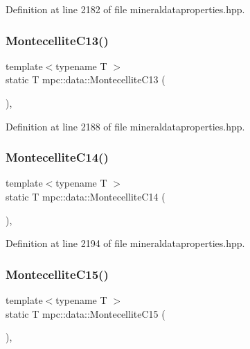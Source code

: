 Definition at line 2182 of file mineraldataproperties.\+hpp.

\mbox{\label{namespacempc_1_1data_a9c1bb28186799335099a03bfcefd5e34}} 
\subsubsection{\texorpdfstring{Montecellite\+C13()}{MontecelliteC13()}}
{\footnotesize\ttfamily template$<$typename T $>$ \\
static T mpc\+::data\+::\+Montecellite\+C13 (\begin{DoxyParamCaption}{ }\end{DoxyParamCaption})\hspace{0.3cm}{\ttfamily [inline]}, {\ttfamily [static]}}



Definition at line 2188 of file mineraldataproperties.\+hpp.

\mbox{\label{namespacempc_1_1data_a2fe4c4d4e7c87e190a3644aba15711b3}} 
\subsubsection{\texorpdfstring{Montecellite\+C14()}{MontecelliteC14()}}
{\footnotesize\ttfamily template$<$typename T $>$ \\
static T mpc\+::data\+::\+Montecellite\+C14 (\begin{DoxyParamCaption}{ }\end{DoxyParamCaption})\hspace{0.3cm}{\ttfamily [inline]}, {\ttfamily [static]}}



Definition at line 2194 of file mineraldataproperties.\+hpp.

\mbox{\label{namespacempc_1_1data_a29c01f309c277c2dd55e2dc85a51b011}} 
\subsubsection{\texorpdfstring{Montecellite\+C15()}{MontecelliteC15()}}
{\footnotesize\ttfamily template$<$typename T $>$ \\
static T mpc\+::data\+::\+Montecellite\+C15 (\begin{DoxyParamCaption}{ }\end{DoxyParamCaption})\hspace{0.3cm}{\ttfamily [inline]}, {\ttfamily [static]}}



